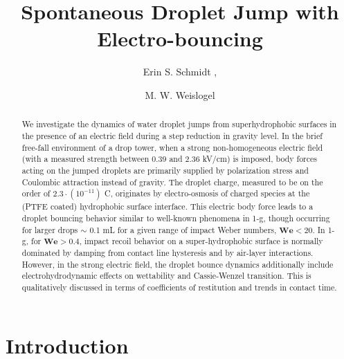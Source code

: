 \documentclass{jfm}
\title{Spontaneous Droplet Jump with Electro-bouncing}
\author{Erin S. Schmidt\aff{1}
  \corresp{\email{esch2@pdx.edu}},
 \and M. W.  Weislogel\aff{1}}
\affiliation{\aff{1}Department of Mechanical Engineering, Portland State University,
Portland, OR 97211, USA
}
\begin{document}
\maketitle

\begin{abstract}
We investigate the dynamics of water droplet jumps from superhydrophobic surfaces in the presence of an electric field during a step reduction in gravity level. In the brief free-fall environment of a drop tower, when a strong non-homogeneous electric field (with a measured strength between $0.39$ and $2.36$ kV/cm) is imposed, body forces acting on the jumped droplets are primarily supplied by polarization stress and Coulombic attraction instead of gravity. The droplet charge, measured to be on the order of $2.3 \cdot(10^{-11})$ C, originates by electro-osmosis of charged species at the (PTFE coated) hydrophobic surface interface. This electric body force leads to a droplet bouncing behavior similar to well-known phenomena in 1-g, though occurring for larger drops $\sim \! \!$ 0.1 mL for a given range of impact Weber numbers, $\mathbf{We} < 20$. In 1-g, for $\mathbf{We} > 0.4$, impact recoil behavior on a super-hydrophobic surface is normally dominated by damping from contact line hysteresis and by air-layer interactions. However, in the strong electric field, the droplet bounce dynamics additionally include electrohydrodynamic effects on wettability and Cassie-Wenzel transition. This is qualitatively discussed in terms of coefficients of restitution and trends in contact time. \end{abstract}

\section{Introduction}\label{sec:intro}



%
%
\end{document}
